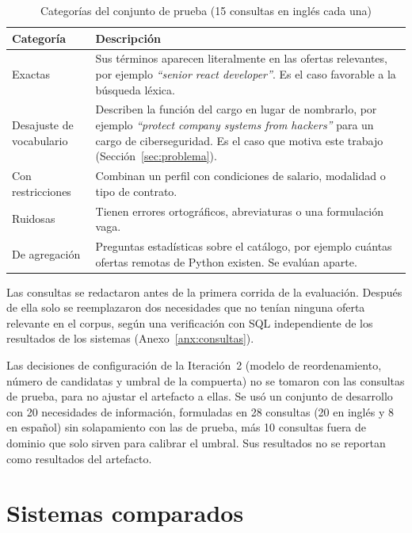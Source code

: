 \begin{table}[htbp!]
    \centering
    \caption{Categorías del conjunto de prueba (15 consultas en inglés cada una)}
    \label{tab:met-categorias}
    \small
    \begin{tabular}{|p{3.4cm}|p{10.8cm}|}
        \hline
        \textbf{Categoría} & \textbf{Descripción} \\
        \hline
        Exactas & Sus términos aparecen literalmente en las ofertas relevantes, por ejemplo \textit{\enquote{senior react developer}}. Es el caso favorable a la búsqueda léxica. \\
        \hline
        Desajuste de vocabulario & Describen la función del cargo en lugar de nombrarlo, por ejemplo \textit{\enquote{protect company systems from hackers}} para un cargo de ciberseguridad. Es el caso que motiva este trabajo (Sección~\ref{sec:problema}). \\
        \hline
        Con restricciones & Combinan un perfil con condiciones de salario, modalidad o tipo de contrato. \\
        \hline
        Ruidosas & Tienen errores ortográficos, abreviaturas o una formulación vaga. \\
        \hline
        De agregación & Preguntas estadísticas sobre el catálogo, por ejemplo cuántas ofertas remotas de Python existen. Se evalúan aparte. \\
        \hline
    \end{tabular}
\end{table}

Las consultas se redactaron antes de la primera corrida de la evaluación. Después de ella solo se reemplazaron dos necesidades que no tenían ninguna oferta relevante en el corpus, según una verificación con SQL independiente de los resultados de los sistemas (Anexo~\ref{anx:consultas}).

Las decisiones de configuración de la Iteración~2 (modelo de reordenamiento, número de candidatas y umbral de la compuerta) no se tomaron con las consultas de prueba, para no ajustar el artefacto a ellas. Se usó un conjunto de desarrollo con 20 necesidades de información, formuladas en 28 consultas (20 en inglés y 8 en español) sin solapamiento con las de prueba, más 10 consultas fuera de dominio que solo sirven para calibrar el umbral. Sus resultados no se reportan como resultados del artefacto.

\section{Sistemas comparados}
\label{sec:met-sistemas}

